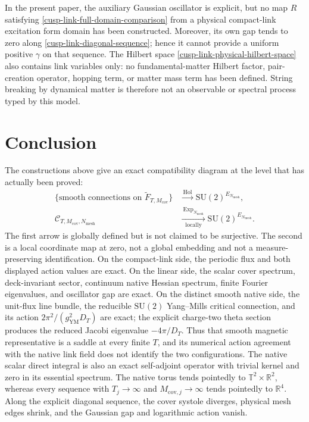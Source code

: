 \documentclass[11pt]{article}
\theoremstyle{definition}
\numberwithin{equation}{section}
\begin{document}
In the present paper, the auxiliary Gaussian oscillator is explicit, but no
map \(R\) satisfying \eqref{cusp-link-full-domain-comparison} from a physical
compact-link excitation form domain has been constructed.  Moreover, its own
gap tends to zero along \eqref{cusp-link-diagonal-sequence}; hence it cannot
provide a uniform positive \(\gamma\) on that sequence.  The Hilbert space
\eqref{cusp-link-physical-hilbert-space} also contains link variables only:
no fundamental-matter Hilbert factor, pair-creation operator, hopping term,
or matter mass term has been defined.  String breaking by dynamical matter is
therefore not an observable or spectral process typed by this model.

\section{Conclusion}

The constructions above give an exact compatibility diagram at the level
that has actually been proved:
\begin{align*}
 \{\text{smooth connections on }\widetilde F_{T,M_{\mathrm{cov}}}\}
 &\xrightarrow{\ \operatorname{Hol}\ }
 \mathrm{SU}(2)^{E_{N_{\mathrm{mesh}}}},\\
 \mathscr C_{T,M_{\mathrm{cov}},N_{\mathrm{mesh}}}
 &\xrightarrow[\text{locally}]{\ \operatorname{Exp}_{N_{\mathrm{mesh}}}\ }
 \mathrm{SU}(2)^{E_{N_{\mathrm{mesh}}}}.
\end{align*}
The first arrow is globally defined but is not claimed to be surjective.
The second is a local coordinate map at zero, not a global embedding and not
a measure-preserving identification.  On the compact-link side, the
 periodic flux and both displayed action values are exact.  On the linear
 side, the scalar cover spectrum, deck-invariant sector, continuum native
 Hessian spectrum, finite Fourier eigenvalues, and oscillator gap are exact.
 On the distinct smooth native side, the unit-flux line bundle, the reducible
 \(\mathrm{SU}(2)\) Yang--Mills critical connection, and its action
 \(2\pi^2/(g_{\mathrm{YM}}^2D_T)\) are exact; the explicit charge-two theta
 section produces the reduced Jacobi eigenvalue \(-4\pi/D_T\).  Thus that
 smooth magnetic representative is a saddle at every finite \(T\), and its
 numerical action agreement with the native link field does not identify the
 two configurations.
 The native scalar direct integral is also an exact self-adjoint operator with
trivial kernel and zero in its essential spectrum.
The native torus tends pointedly to \(\mathbb T^2\times\mathbb R^2\), whereas
every sequence with \(T_j\to\infty\) and
\(M_{\mathrm{cov},j}\to\infty\) tends pointedly to \(\mathbb R^4\).  Along the
explicit diagonal sequence, the cover systole diverges, physical mesh edges
shrink, and the Gaussian gap and logarithmic action vanish.
\end{document}
